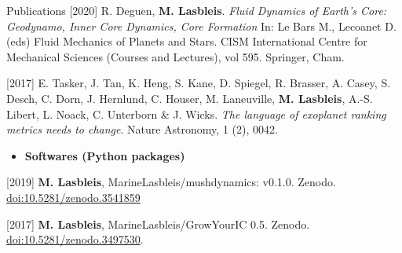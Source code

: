 \documentclass{cv}
\begin{document}
\begin{rubrique}{Publications}
[2020] R. Deguen, \textbf{M. Lasbleis}. \textit{Fluid Dynamics of Earth's Core: Geodynamo, Inner Core Dynamics, Core Formation} In: Le Bars M., Lecoanet D. (eds) Fluid Mechanics of Planets and Stars. CISM International Centre for Mechanical Sciences (Courses and Lectures), vol 595. Springer, Cham.

[2017] E. Tasker, J. Tan, K. Heng, S. Kane, D. Spiegel, R. Brasser, A. Casey, S. Desch, C. Dorn, J. Hernlund, C. Houser, M. Laneuville, \textbf{M. Lasbleis}, A.-S. Libert, L. Noack, C. Unterborn \& J. Wicks. \textit{The language of exoplanet ranking metrics needs to change}. Nature Astronomy,  1 (2), 0042.


\begin{itemize}
	\item \textbf{Softwares (Python packages)}
\end{itemize}

[2019] \textbf{M. Lasbleis},  MarineLasbleis/mushdynamics: v0.1.0. Zenodo. \href{http://doi.org/10.5281/zenodo.3541859}{doi:10.5281/zenodo.3541859}

[2017] \textbf{M. Lasbleis},  MarineLasbleis/GrowYourIC 0.5. Zenodo. \href{http://doi.org/10.5281/zenodo.3497530}{doi:10.5281/zenodo.3497530}. 

	


\end{rubrique}

\end{document}
